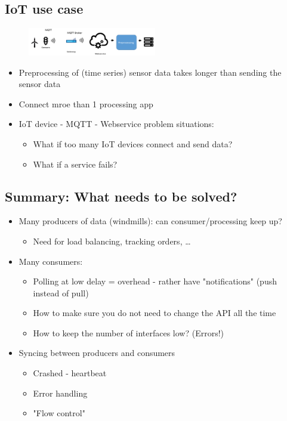 \documentclass{article}
\begin{document}
\subsection{IoT use case}

\begin{figure}[H]
    \centering
    \includegraphics[width=0.5\textwidth]{streamprocessing-iot-usecase.png}
\end{figure}

\begin{itemize}
    \item Preprocessing of (time series) sensor data takes longer than sending the sensor data
    \item Connect mroe than 1 processing app
    \item IoT device - MQTT - Webservice problem situations:
    \begin{itemize}
        \item What if too many IoT devices connect and send data?
        \item What if a service fails?
    \end{itemize}
\end{itemize}

\subsection{Summary: What needs to be solved?}

\begin{itemize}
    \item Many producers of data (windmills): can consumer/processing keep up?
    \begin{itemize}
        \item Need for load balancing, tracking orders, \dots
    \end{itemize}
    \item Many consumers:
    \begin{itemize}
        \item Polling at low delay = overhead - rather have "notifications" (push instead of pull)
        \item How to make sure you do not need to change the API all the time
        \item How to keep the number of interfaces low? (Errors!)
    \end{itemize}
    \item Syncing between producers and consumers
    \begin{itemize}
        \item Crashed - heartbeat
        \item Error handling
        \item "Flow control"
    \end{itemize}
\end{itemize}
\end{document}
